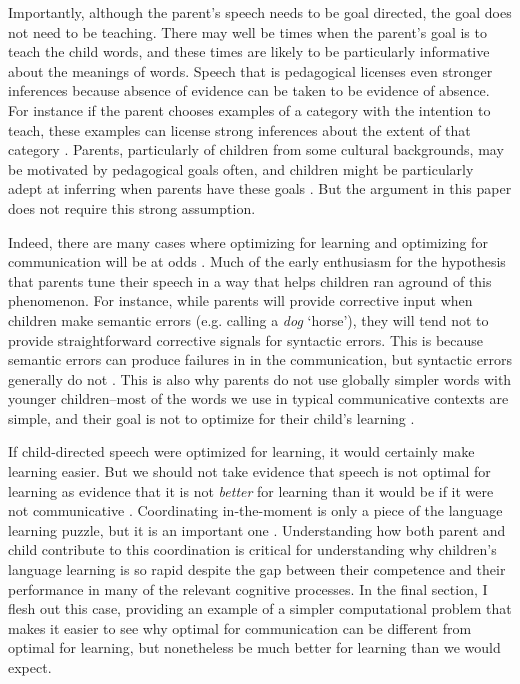 \documentclass[review]{elsarticle}
\begin{document}
Importantly, although the parent's speech needs to be goal directed, the goal does not need to be teaching. There may well be times when the parent's goal is to teach the child words, and these times are likely to be particularly informative about the meanings of words. Speech that is pedagogical licenses even stronger inferences because absence of evidence can be taken to be evidence of absence. For instance if the parent chooses examples of a category with the intention to teach, these examples can license strong inferences about the extent of that category \citep[e.g. a parent would be unlikely to choose three peppers to teach the child \emph{vegetable};][]{xu2007}. Parents, particularly of children from some cultural backgrounds, may be motivated by pedagogical goals often, and children might be particularly adept at inferring when parents have these goals \citep{csibra2009}. But the argument in this paper does not require this strong assumption.

Indeed, there are many cases where optimizing for learning and optimizing for communication will be at odds \citep{kirby2015}. Much of the early enthusiasm for the hypothesis that parents tune their speech in a way that helps children ran aground of this phenomenon. For instance, while parents will provide corrective input when children make semantic errors (e.g. calling a \emph{dog} `horse'), they will tend not to provide straightforward corrective signals for syntactic errors. This is because semantic errors can produce failures in in the communication, but syntactic errors generally do not \citep{newport1977}. This is also why parents do not use globally simpler words with younger children--most of the words we use in typical communicative contexts are simple, and their goal is not to optimize for their child's learning \citep{hayes1988,yurovsky2016a}. 

If child-directed speech were optimized for learning, it would certainly make learning easier. But we should not take evidence that speech is not optimal for learning as evidence that it is not \emph{better} for learning than it would be if it were not communicative \citep{eaves-jr2016,mcmurray2013}. Coordinating in-the-moment is only a piece of the language learning puzzle, but it is an important one \citep{tomasello2000}. Understanding how both parent and child contribute to this coordination is critical for understanding why children's language learning is so rapid despite the gap between their competence and their performance in many of the relevant cognitive processes. In the final section, I flesh out this case, providing an example of a simpler computational problem that makes it easier to see why optimal for communication can be different from optimal for learning, but nonetheless be much better for learning than we would expect.
\end{document}
